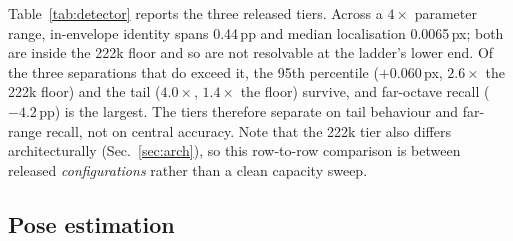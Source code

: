 \documentclass[10pt,twocolumn,letterpaper]{article}
\begin{document}
Table~\ref{tab:detector} reports the three released tiers. Across a $4\times$ parameter range,
in-envelope identity spans 0.44\,pp and median localisation 0.0065\,px; both are inside the 222k
floor and so are not resolvable at the ladder's lower end. Of the three separations that do exceed
it, the 95th percentile ($+0.060$\,px, $2.6\times$ the 222k floor) and the tail
($4.0\times$, $1.4\times$ the floor) survive, and far-octave recall ($-4.2$\,pp) is the largest.
The tiers therefore separate on tail behaviour and far-range recall, not on central accuracy.
Note that the 222k tier also differs architecturally (Sec.~\ref{sec:arch}), so this row-to-row
comparison is between released \emph{configurations} rather than a clean capacity sweep.

\subsection{Pose estimation}
\label{sec:pose}
\end{document}
